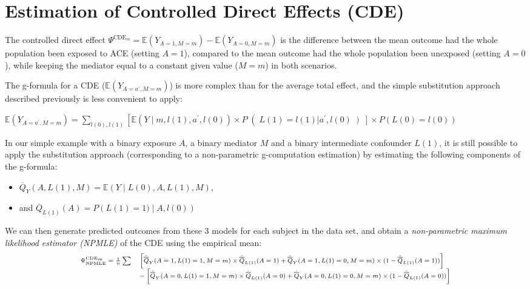 \documentclass[
]{book}
\providecommand{\tightlist}{%
  \setlength{\itemsep}{0pt}\setlength{\parskip}{0pt}}
\begin{document}
\section{Estimation of Controlled Direct Effects (CDE)}\label{estimation-of-controlled-direct-effects-cde}

The controlled direct effect \(\Psi^{\text{CDE}_m} = \mathbb{E}(Y_{A=1,M=m}) - \mathbb{E}(Y_{A=0,M=m})\) is the difference between the mean outcome had the whole population been exposed to ACE (setting \(A=1\)), compared to the mean outcome had the whole population been unexposed (setting \(A=0\)), while keeping the mediator equal to a constant given value (\(M=m\)) in both scenarios.

The g-formula for a CDE (\(\mathbb{E}(Y_{A=a^\prime,M=m})\)) is more complex than for the average total effect, and the simple substitution approach described previously is less convenient to apply:

\(\mathbb{E}(Y_{A=a^\prime,M=m}) = \sum_{l(0),l(1)} \left[ \mathbb{E}\left(Y \mid m, l(1), a^\prime, l(0) \right) \times P\right( L(1)=l(1) | a^\prime,l(0) \left) \right] \times P\left( L(0)=l(0) \right)\)

In our simple example with a binary exposure \(A\), a binary mediator \(M\) and a binary intermediate confounder \(L(1)\), it is still possible to apply the substitution approach (corresponding to a non-parametric g-computation estimation) by estimating the following components of the g-formula:

\begin{itemize}
\tightlist
\item
  \(\overline{Q}_Y(A,L(1),M)=\mathbb{E}\left(Y \mid L(0), A,L(1), M \right)\),
\item
  and \(\overline{Q}_{L(1)}(A)=P\left(L(1)=1) \mid A, l(0)\right)\)
\end{itemize}

We can then generate predicted outcomes from these 3 models for each subject in the data set, and obtain a \emph{non-parametric maximum likelihood estimator (NPMLE)} of the CDE using the empirical mean:
\[\scriptsize
\begin{array}{r l}
\Psi^{\text{CDE}_m}_{\text{NPMLE}} = \frac{1}{n}\sum & \left[\hat{\overline{Q}}_Y(A=1,L(1)=1,M=m) \times \hat{\overline{Q}}_{L(1)}(A=1) + \hat{\overline{Q}}_Y(A=1,L(1)=0,M=m) \times (1 - \hat{\overline{Q}}_{L(1)}(A=1))\right]\\
  &  - \left[\hat{\overline{Q}}_Y(A=0,L(1)=1,M=m) \times \hat{\overline{Q}}_{L(1)}(A=0) + \hat{\overline{Q}}_Y(A=0,L(1)=0,M=m) \times (1 - \hat{\overline{Q}}_{L(1)}(A=0))\right]
\end{array}\]
\end{document}
